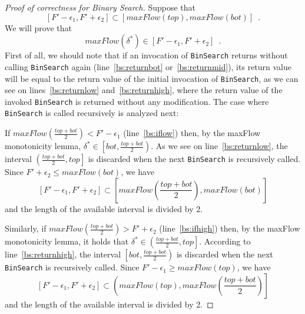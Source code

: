 \begin{proof}[Proof of correctness for Binary Search]
  Suppose that
  \begin{equation*}
    \left[F' - \epsilon_1, F' + \epsilon_2\right] \subset \left[maxFlow\left(top\right), maxFlow\left(bot\right)\right]
    \enspace.
  \end{equation*}
  We will prove that
  \begin{equation*}
    maxFlow\left(\delta^*\right) \in \left[F' - \epsilon_1, F' + \epsilon_2\right] \enspace.
  \end{equation*}
  First of all, we should note that if an invocation of \texttt{BinSearch} returns without calling \texttt{BinSearch} again
  (line~\ref{bs:returnbot} or~\ref{bs:returnmid}), its return value will be equal to the return value of the initial
  invocation of \texttt{BinSearch}, as we can see on lines~\ref{bs:returnlow} and~\ref{bs:returnhigh}, where the return
  value of the invoked \texttt{BinSearch} is returned without any modification. The case where \texttt{BinSearch} is called
  recursively is analyzed next:

  If $maxFlow\left(\frac{top+bot}{2}\right) < F' - \epsilon_1$ (line~\ref{bs:iflow}) then, by the maxFlow monotonicity
  lemma, $\delta^* \in \left[bot,\frac{top+bot}{2}\right)$. As we see on line~\ref{bs:returnlow}, the interval
  $\left(\frac{top+bot}{2}, top\right]$ is discarded when the next \texttt{BinSearch} is recursively called. Since
  $F' + \epsilon_2 \leq maxFlow\left(bot\right)$, we have
  \begin{equation*}
    \left[F' - \epsilon_1, F' + \epsilon_2\right] \subset \left[maxFlow\left(\frac{top+bot}{2}\right),
    maxFlow\left(bot\right)\right]
  \end{equation*}
  and the length of the available interval is divided by 2.

  Similarly, if $maxFlow\left(\frac{top+bot}{2}\right) > F' + \epsilon_2$ (line~\ref{bs:ifhigh}) then, by the maxFlow
  monotonicity lemma, it holds that $\delta^* \in \left(\frac{top+bot}{2}, top\right]$. According to
  line~\ref{bs:returnhigh}, the interval $\left[bot, \frac{top+bot}{2}\right)$ is discarded when the next
  \texttt{BinSearch} is recursively called. Since $F'- \epsilon_1 \geq maxFlow\left(top\right)$, we have
  \begin{equation*}
    \left[F' - \epsilon_1, F' + \epsilon_2\right] \subset \left(maxFlow\left(top\right),
    maxFlow\left(\frac{top+bot}{2}\right)\right]
  \end{equation*}
  and the length of the available interval is divided by 2.


\end{proof}

